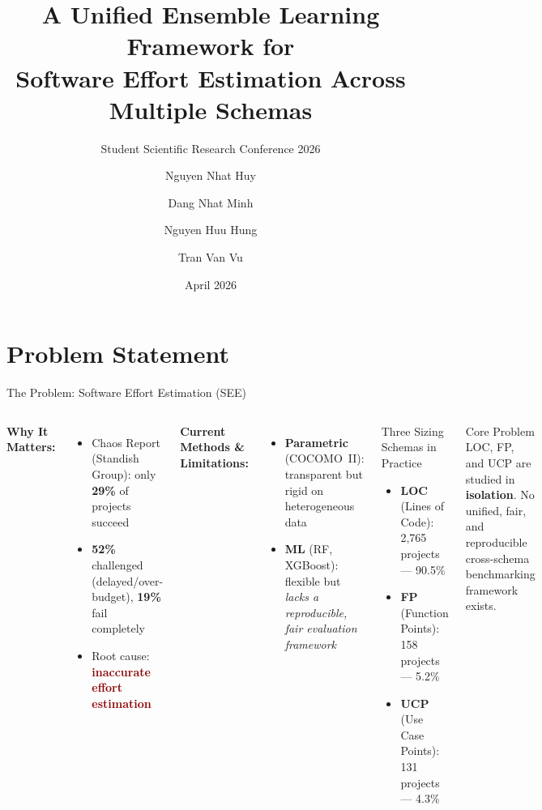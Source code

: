 \documentclass[aspectratio=169]{beamer}
\title[Insightimate]{A Unified Ensemble Learning Framework for\\Software Effort Estimation Across Multiple Schemas}
\subtitle{Student Scientific Research Conference 2026}
\author[Huy et al.]{%
  \small Nguyen Nhat Huy \and Dang Nhat Minh \and Nguyen Huu Hung \and Tran Van Vu}
\institute[DTU]{%
  \normalsize Supervisor: Dr. Nguyen Duc Man \\
  \small International School --- Duy Tan University, Da Nang}
\date{April 2026}
\begin{document}
\begin{frame}
\titlepage
\end{frame}

\section{Problem Statement}

\begin{frame}{The Problem: Software Effort Estimation (SEE)}
\begin{columns}[T]
\textbf{Why It Matters:}
\begin{itemize}
    \item Chaos Report (Standish Group): only \textbf{29\%} of projects succeed
    \item \textbf{52\%} challenged (delayed/over-budget), \textbf{19\%} fail completely
    \item Root cause: \textcolor{darkred}{\textbf{inaccurate effort estimation}}
\end{itemize}

\vspace{0.3cm}
\textbf{Current Methods \& Limitations:}
\begin{itemize}
    \item \textbf{Parametric} (COCOMO~II): transparent but rigid on heterogeneous data
    \item \textbf{ML} (RF, XGBoost): flexible but \emph{lacks a reproducible, fair evaluation framework}
\end{itemize}

\begin{block}{Three Sizing Schemas in Practice}
\begin{itemize}
    \item \textbf{LOC} (Lines of Code): 2,765 projects --- 90.5\%
    \item \textbf{FP} (Function Points): 158 projects --- 5.2\%
    \item \textbf{UCP} (Use Case Points): 131 projects --- 4.3\%
\end{itemize}
\end{block}

\vspace{0.25cm}
\begin{alertblock}{Core Problem}
LOC, FP, and UCP are studied in \textbf{isolation}. No unified, fair, and reproducible cross-schema benchmarking framework exists.
\end{alertblock}
\end{columns}
\end{frame}
\end{document}
